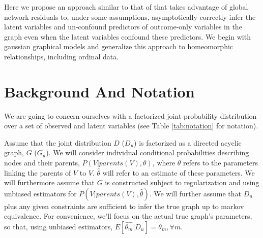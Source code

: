 \documentclass{article}
\begin{document}
Here we propose an approach similar to that of \cite{elidan_ideal_2007} that takes advantage of global network residuals to, under some assumptions, asymptotically correctly infer the latent variables and un-confound predictors of outcome-only variables in the graph even when the latent variables confound these predictors. We begin with gaussian graphical models and generalize this approach to homeomorphic relationships, including ordinal data.

\section{Background And Notation}
\label{Background}

We are going to concern ourselves with a factorized joint probability distribution over a set of observed and latent variables (see Table \ref{tab:notation} for notation).  


\begin{table}
\captionsetup{font=scriptsize}
\centering
{}
\bigskip
\caption{Notation}
\label{tab:notation}
\vspace{-5mm}
\end{table}


Assume that the joint distribution $D$ ($D_u$) is factorized as a directed acyclic graph, $G$ ($G_u$).  We will consider individual conditional probabilities describing nodes and their parents, $P(V | parents(V), \theta)$, where $\theta$ refers to the parameters linking  the parents of $V$ to $V$.  $\hat{\theta}$ will refer to an estimate of these parameters.  We will furthermore assume that $G$ is constructed subject to regularization and using unbiased estimators for $P(V | parents(V), \hat{\theta})$.  We will further assume that $D_u$ plus any given constraints are sufficient to infer the true graph up to markov equivalence.  For convenience, we'll focus on the actual true graph's parameters, so that, using unbiased estimators, $E[\hat{\theta_m}|D_u] = \theta_m, \forall m$.
\end{document}
